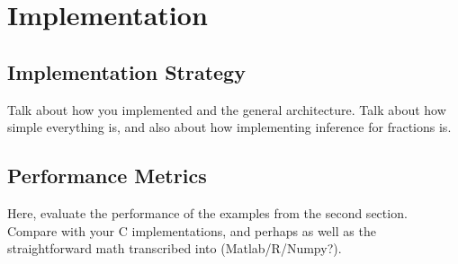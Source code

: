 \section{Implementation}

\subsection{Implementation Strategy}

Talk about how you implemented \LANG{} and the general
architecture. Talk about how simple everything is, and also
about how implementing inference for fractions is. 

\subsection{Performance Metrics}

Here, evaluate the performance of the examples from the second
section.  Compare with your C implementations, and perhaps as well as
the straightforward math transcribed into (Matlab/R/Numpy?).
